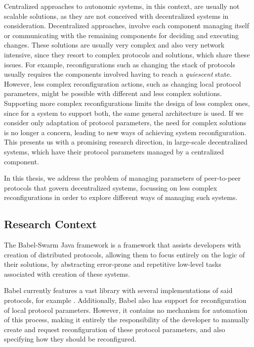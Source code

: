 Centralized approaches to autonomic systems, in this context, are usually not scalable solutions\cite{Hiltunen1999, Garlan2004, Rosa2007}, as they are not conceived with decentralized systems in consideration. Decentralized approaches, involve each component managing itself or communicating with the remaining components for deciding and executing changes\cite{Quin2021, Weyns2012}. These solutions are usually very complex and also very network intensive, since they resort to complex protocols and solutions, which share these issues. For example, reconfigurations such as changing the stack of protocols usually requires the components involved having to reach a \textit{quiescent} state\cite{Rosa2012}. However, less complex reconfiguration actions, such as changing local protocol parameters, might be possible with different and less complex solutions. Supporting more complex reconfigurations limits the design of less complex ones, since for a system to support both, the same general architecture is used. If we consider only adaptation of protocol parameters, the need for complex solutions is no longer a concern, leading to new ways of achieving system reconfiguration. This presents us with a promising research direction, in large-scale decentralized systems, which have their protocol parameters managed by a centralized component.

In this thesis, we address the problem of managing parameters of peer-to-peer protocols that govern decentralized systems, focussing on less complex reconfigurations in order to explore different ways of managing such systems.

\subsection*{Research Context}
\label{sec_research_context}

The Babel-Swarm Java framework \cite{Fouto2022} is a framework that assists developers with creation of distributed protocols, allowing them to focus entirely on the logic of their solutions, by abstracting error-prone and repetitive low-level tasks associated with creation of these systems.

Babel currently features a vast library with several implementations of said protocols, for example \cite{Leitao2007a, Leitao2010a}. Additionally, Babel also has support for reconfiguration of local protocol parameters. However, it contains no mechanism for automation of this process, making it entirely the responsibility of the developer to manually create and request reconfiguration of these protocol parameters, and also specifying how they should be reconfigured.

